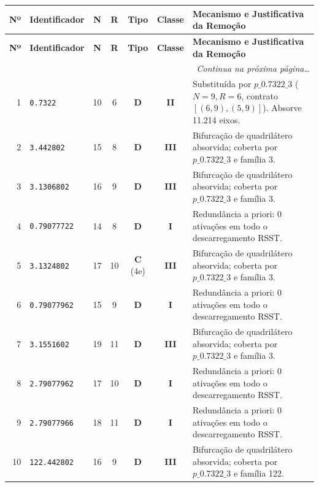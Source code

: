 \documentclass[11pt,a4paper]{article}
\begin{document}
\vspace{0.3cm}

\begin{small}
\begin{longtable}{r l c c c c p{8.8cm}}
\toprule
\textbf{Nº} & \textbf{Identificador} & \textbf{N} & \textbf{R} & \textbf{Tipo} & \textbf{Classe} & \textbf{Mecanismo e Justificativa da Remoção} \\
\midrule
\endfirsthead
\toprule
\textbf{Nº} & \textbf{Identificador} & \textbf{N} & \textbf{R} & \textbf{Tipo} & \textbf{Classe} & \textbf{Mecanismo e Justificativa da Remoção} \\
\midrule
\endhead
\midrule
\multicolumn{7}{r}{\textit{Continua na próxima página\dots}} \\
\bottomrule
\endfoot
\bottomrule
\endlastfoot

1 & \texttt{0.7322} & 10 & 6 & \textbf{D} & \textbf{II} & Substituída por $p\_0.7322\_3$ ($N=9, R=6$, contrato $[(6,9),(5,9)]$). Absorve 11.214 eixos. \\
2 & \texttt{3.442802} & 15 & 8 & \textbf{D} & \textbf{III} & Bifurcação de quadrilátero absorvida; coberta por $p\_0.7322\_3$ e família 3. \\
3 & \texttt{3.1306802} & 16 & 9 & \textbf{D} & \textbf{III} & Bifurcação de quadrilátero absorvida; coberta por $p\_0.7322\_3$ e família 3. \\
4 & \texttt{0.79077722} & 14 & 8 & \textbf{D} & \textbf{I} & Redundância a priori: 0 ativações em todo o descarregamento RSST. \\
5 & \texttt{3.1324802} & 17 & 10 & \textbf{C} (4e) & \textbf{III} & Bifurcação de quadrilátero absorvida; coberta por $p\_0.7322\_3$ e família 3. \\
6 & \texttt{0.79077962} & 15 & 9 & \textbf{D} & \textbf{I} & Redundância a priori: 0 ativações em todo o descarregamento RSST. \\
7 & \texttt{3.1551602} & 19 & 11 & \textbf{D} & \textbf{III} & Bifurcação de quadrilátero absorvida; coberta por $p\_0.7322\_3$ e família 3. \\
8 & \texttt{2.79077962} & 17 & 10 & \textbf{D} & \textbf{I} & Redundância a priori: 0 ativações em todo o descarregamento RSST. \\
9 & \texttt{2.79077966} & 18 & 11 & \textbf{D} & \textbf{I} & Redundância a priori: 0 ativações em todo o descarregamento RSST. \\
10 & \texttt{122.442802} & 16 & 9 & \textbf{D} & \textbf{III} & Bifurcação de quadrilátero absorvida; coberta por $p\_0.7322\_3$ e família 122. \\

\end{longtable}
\end{small}
\end{document}
